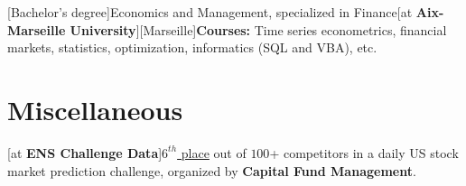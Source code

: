 \documentclass[a4paper]{arthur-cv}
\begin{document}
\begin{textblock}{20.5}
\begin{minipage}[t]{0.61\textwidth}
\begin{rightenv}
        [Bachelor's degree]{Economics and Management, specialized in Finance}[at \textbf{Aix-Marseille University}][Marseille]{\textbf{Courses:} Time series econometrics, financial markets, statistics, optimization, informatics (SQL and VBA), etc.}
      \end{rightenv}

    \section{Miscellaneous}
      \begin{rightenv}
        [at \textbf{ENS Challenge Data}]{\href{http://datachallenge.cfm.fr/t/end-of-year-ranking-2019-official-top-10/243}{\textcolor{colhyperlink}{$6^{th}$} place} out of $100$+ competitors in a daily US stock market prediction challenge, organized by \textbf{Capital Fund Management}.}

      \end{rightenv}

  \end{minipage}

\end{textblock}
\end{document}
